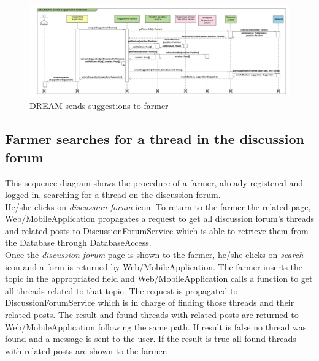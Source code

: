 \newpage
\begin{landscape}
\begin{figure}[h]
\vspace*{-2cm}
\noindent
\centering
\centerline{\includegraphics[scale= 0.108]{./Images/Sequence diagram/DREAM sends suggestions to farmer.png}}
    \caption{DREAM sends suggestions to farmer}
    \vspace*{-12cm}
\end{figure}
\fillandplacepagenumber
\end{landscape}

\subsection{Farmer searches for a thread in the discussion forum}

This sequence diagram shows the procedure of a farmer, already registered and logged in, searching for a thread on the discussion forum.\\
He/she clicks on \textit{discussion forum} icon. To return to the farmer the related page, Web/MobileApplication propagates a request to get all discussion forum's threads and related posts to DiscussionForumService which is able to retrieve them from the Database through DatabaseAccess.\\ 
Once the \textit{discussion forum} page is shown to the farmer, he/she clicks on \textit{search} icon and a form is returned by Web/MobileApplication. The farmer inserts the topic in the appropriated field and Web/MobileApplication calls a function to get all threads related to that topic. The request is propagated to DiscussionForumService which is in charge of finding those threads and their related posts. The result and found threads with related posts are returned to Web/MobileApplication following the same path. If result is false no thread was found and a message is sent to the user. If the result is true all found threads with related posts are shown to the farmer.

